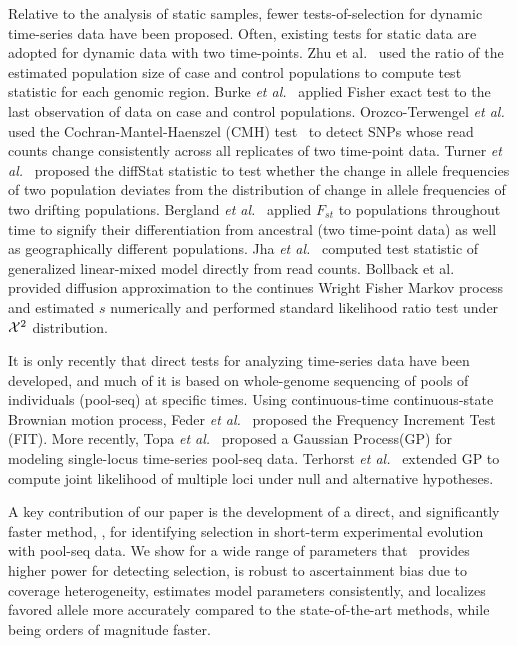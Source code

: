 Relative to the analysis of static samples, fewer tests-of-selection
for dynamic time-series data have been proposed. Often, existing tests
for static data are adopted for dynamic data with two time-points. Zhu
et al.~\cite{zhou2011experimental} used the ratio of the estimated
population size of case and control populations to compute test
statistic for each genomic region. Burke \emph{et
 al.}~\cite{burke2010genome} applied Fisher exact test to the last
observation of data on case and control populations. Orozco-Terwengel
\emph{et al.}~\cite{orozco2012adaptation} used the
Cochran-Mantel-Haenszel (CMH) test~\cite{agresti2011categorical} to
detect SNPs whose read counts change consistently across all
replicates of two time-point data. Turner \emph{et
 al.}~\cite{turner2011population} proposed the diffStat statistic to
test whether the change in allele frequencies of two population
deviates from the distribution of change in allele frequencies of two
drifting populations. Bergland \emph{et
 al.}~\cite{bergland2014genomic} applied $F_{st}$ to populations
throughout time to signify their differentiation from ancestral (two
time-point data) as well as geographically different populations. Jha
\emph{et al.}~\cite{jha2015whole} computed test statistic of
generalized linear-mixed model directly from read counts. Bollback et
al.~\cite{bollback2008estimation} provided diffusion approximation to
the continues Wright Fisher Markov process and estimated $s$
numerically and performed standard likelihood ratio test under ${\cal X}^2$
distribution.

It is only recently that direct tests for analyzing time-series data
have been developed, and much of it is based on whole-genome
sequencing of pools of individuals (pool-seq) at specific times. Using
continuous-time continuous-state Brownian motion process, Feder
\emph{et al.}~\cite{feder2014Identifying} proposed the Frequency
Increment Test (FIT). More recently, Topa \emph{et
  al.}~\cite{topa2015gaussian} proposed a Gaussian Process(GP) for
modeling single-locus time-series pool-seq data. Terhorst \emph{et
  al.}~\cite{Terhorst2015Multi} extended GP to compute joint
likelihood of multiple loci under null and alternative hypotheses.

A key contribution of our paper
is the development of a direct, and significantly faster method,
\comale, for identifying selection in short-term experimental
evolution with pool-seq data. We show for a wide range of parameters
that \comale\ provides higher power for detecting selection, is robust
to ascertainment bias due to coverage heterogeneity, estimates model
parameters consistently, and localizes favored allele more accurately
compared to the state-of-the-art methods, while being orders of
magnitude faster.
